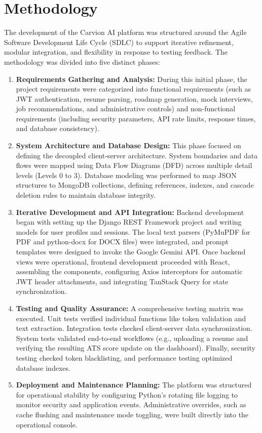 \documentclass[12pt]{article}
\begin{document}
\clearpage
\section{Methodology}

The development of the Carvion AI platform was structured around the Agile Software Development Life Cycle (SDLC) to support iterative refinement, modular integration, and flexibility in response to testing feedback. The methodology was divided into five distinct phases:

\begin{enumerate}
  \item \textbf{Requirements Gathering and Analysis:} During this initial phase, the project requirements were categorized into functional requirements (such as JWT authentication, resume parsing, roadmap generation, mock interviews, job recommendations, and administrative controls) and non-functional requirements (including security parameters, API rate limits, response times, and database consistency).
  \item \textbf{System Architecture and Database Design:} This phase focused on defining the decoupled client-server architecture. System boundaries and data flows were mapped using Data Flow Diagrams (DFD) across multiple detail levels (Levels 0 to 3). Database modeling was performed to map JSON structures to MongoDB collections, defining references, indexes, and cascade deletion rules to maintain database integrity.
  \item \textbf{Iterative Development and API Integration:} Backend development began with setting up the Django REST Framework project and writing models for user profiles and sessions. The local text parsers (PyMuPDF for PDF and python-docx for DOCX files) were integrated, and prompt templates were designed to invoke the Google Gemini API. Once backend views were operational, frontend development proceeded with React, assembling the components, configuring Axios interceptors for automatic JWT header attachments, and integrating TanStack Query for state synchronization.
  \item \textbf{Testing and Quality Assurance:} A comprehensive testing matrix was executed. Unit tests verified individual functions like token validation and text extraction. Integration tests checked client-server data synchronization. System tests validated end-to-end workflows (e.g., uploading a resume and verifying the resulting ATS score update on the dashboard). Finally, security testing checked token blacklisting, and performance testing optimized database indexes.
  \item \textbf{Deployment and Maintenance Planning:} The platform was structured for operational stability by configuring Python's rotating file logging to monitor security and application events. Administrative overrides, such as cache flushing and maintenance mode toggling, were built directly into the operational console.
\end{enumerate}
\end{document}
